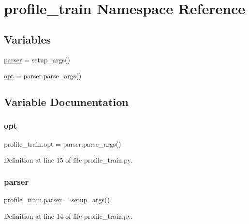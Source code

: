 \hypertarget{namespaceprofile__train}{}\section{profile\+\_\+train Namespace Reference}
\label{namespaceprofile__train}
\subsection*{Variables}
\begin{DoxyCompactItemize}
\item 
\hyperlink{namespaceprofile__train_a82ea6ec33dd7cd781e4e778f9e52112f}{parser} = setup\+\_\+args()
\item 
\hyperlink{namespaceprofile__train_afdda29d62ab3e138ea37cc14c6396a3e}{opt} = parser.\+parse\+\_\+args()
\end{DoxyCompactItemize}


\subsection{Variable Documentation}
\mbox{\label{namespaceprofile__train_afdda29d62ab3e138ea37cc14c6396a3e}} 
\subsubsection{\texorpdfstring{opt}{opt}}
{\footnotesize\ttfamily profile\+\_\+train.\+opt = parser.\+parse\+\_\+args()}



Definition at line 15 of file profile\+\_\+train.\+py.

\mbox{\label{namespaceprofile__train_a82ea6ec33dd7cd781e4e778f9e52112f}} 
\subsubsection{\texorpdfstring{parser}{parser}}
{\footnotesize\ttfamily profile\+\_\+train.\+parser = setup\+\_\+args()}



Definition at line 14 of file profile\+\_\+train.\+py.


